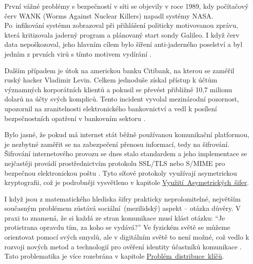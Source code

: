 První vážné problémy s bezpečností v síti se objevily v roce 1989, kdy počítačový červ WANK (Worms Against Nuclear Killers) napadl systémy NASA. Po~infikování systému zobrazoval při přihlášení politicky motivovanou zprávu, která kritizovala jaderný program a plánovaný start sondy Galileo. I když červ data nepoškozoval, jeho hlavním cílem bylo šíření anti-jaderného poselství a byl jedním z prvních virů s tímto motivem vydírání \parencite{erben2014}.

Dalším případem je útok na americkou banku Citibank, na kterou se zaměřil ruský hacker Vladimir Levin. Celkem jednoduše získal přístup k účtům významných korporátních klientů a pokusil se převést přibližně 10,7 milionu dolarů na účty svých kompliců. Tento incident vyvolal mezinárodní pozornost, upozornil na zranitelnosti elektronického bankovnictví a vedl k posílení bezpečnostních opatření v bankovním sektoru \parencite{erben2014}.

Bylo jasné, že pokud má internet stát běžně používanou komunikační platformou, je nezbytné zaměřit se na zabezpečení přenosu informací, tedy na šifrování. Šifrování internetového provozu se dnes stalo standardem a jeho implementace se nejčastěji provádí prostřednictvím protokolu SSL/TLS nebo S/MIME pro bezpečnou elektronickou poštu \parencite{pavlicek2012}. Tyto síťové protokoly využívají asymetrickou kryptografii, což je podrobněji vysvětleno v kapitole \mbox{\hyperref[sec:asymetricka-kryptografie]{Využití Asymetrických šifer}.}

I když jsou z matematického hlediska šifry prakticky neprolomitelné, největším současným problémem zůstává sociální~(mezilidský) aspekt -- otázka důvěry. V praxi to znamená, že si každá ze stran komunikace musí klást otázku: \enquote{Je protistrana opravdu tím, za koho se vydává?} Ve fyzickém světě se můžeme orientovat pomocí svých smyslů, ale v digitálním světě to není možné, což vedlo k rozvoji nových metod a technologií pro ověření identity účastníků komunikace \parencite{burda2019}. Tato problematika je více rozebrána v kapitole \mbox{\hyperref[sec:distribuce-klicu]{Problém distribuce klíčů}.}

\newpage